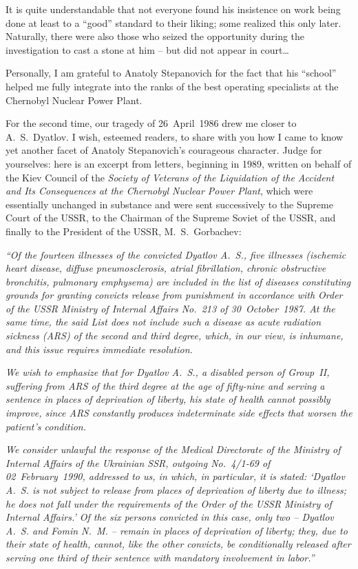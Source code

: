 \documentclass[openright]{bookest}
\begin{document}
It is quite understandable that not everyone found his insistence on work being done at least to a ``good'' standard to their liking; some realized this only later. Naturally, there were also those who seized the opportunity during the investigation to cast a stone at him -- but did not appear in court\ldots

Personally, I am grateful to Anatoly Stepanovich for the fact that his ``school'' helped me fully integrate into the ranks of the best operating specialists at the Chernobyl Nuclear Power Plant.

For the second time, our tragedy of 26~April~1986 drew me closer to A.~S.~Dyatlov. I wish, esteemed readers, to share with you how I came to know yet another facet of Anatoly Stepanovich's courageous character. Judge for yourselves: here is an excerpt from letters, beginning in 1989, written on behalf of the Kiev Council of the \textit{Society of Veterans of the Liquidation of the Accident and Its Consequences at the Chernobyl Nuclear Power Plant}, which were essentially unchanged in substance and were sent successively to the Supreme Court of the USSR, to the Chairman of the Supreme Soviet of the USSR, and finally to the President of the USSR, M.~S.~Gorbachev:

\begin{personal}
\textit{``Of the fourteen illnesses of the convicted Dyatlov A.~S., five illnesses (ischemic heart disease, diffuse pneumosclerosis, atrial fibrillation, chronic obstructive bronchitis, pulmonary emphysema) are included in the list of diseases constituting grounds for granting convicts release from punishment in accordance with Order of the USSR Ministry of Internal Affairs No.~213 of 30~October~1987. At the same time, the said List does not include such a disease as acute radiation sickness (ARS) of the second and third degree, which, in our view, is inhumane, and this issue requires immediate resolution.}

\textit{We wish to emphasize that for Dyatlov A.~S., a disabled person of Group~II, suffering from ARS of the third degree at the age of fifty-nine and serving a sentence in places of deprivation of liberty, his state of health cannot possibly improve, since ARS constantly produces indeterminate side effects that worsen the patient's condition.}

\textit{We consider unlawful the response of the Medical Directorate of the Ministry of Internal Affairs of the Ukrainian SSR, outgoing No.~4/1-69 of 02~February~1990, addressed to us, in which, in particular, it is stated: `Dyatlov A.~S. is not subject to release from places of deprivation of liberty due to illness; he does not fall under the requirements of the Order of the USSR Ministry of Internal Affairs.' Of the six persons convicted in this case, only two -- Dyatlov A.~S. and Fomin N.~M. -- remain in places of deprivation of liberty; they, due to their state of health, cannot, like the other convicts, be conditionally released after serving one third of their sentence with mandatory involvement in labor.''}
\end{personal}
\end{document}
